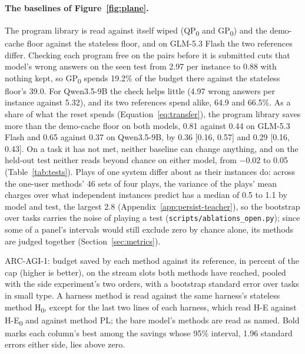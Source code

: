 \paragraph{The baselines of Figure~\ref{fig:plane}.}
\label{app:plane-baselines}
The program library is read against itself wiped (QP\textsubscript{0} and GP\textsubscript{0}) and the demo-cache floor against the stateless floor, and on GLM-5.3 Flash the two references differ. Checking each program free on the pairs before it is submitted cuts that model's wrong answers on the seen test from 2.97 per instance to 0.88 with nothing kept, so GP\textsubscript{0} spends 19.2\% of the budget there against the stateless floor's 39.0. For Qwen3.5-9B the check helps little (4.97 wrong answers per instance against 5.32), and its two references spend alike, 64.9 and 66.5\%. As a share of what the reset spends (Equation~\ref{eq:transfer}), the program library saves more than the demo-cache floor on both models, 0.81 against 0.44 on GLM-5.3 Flash and 0.65 against 0.37 on Qwen3.5-9B, by 0.36 [0.16, 0.57] and 0.29 [0.16, 0.43]. On a task it has not met, neither baseline can change anything, and on the held-out test neither reads beyond chance on either model, from $-0.02$ to 0.05 (Table~\ref{tab:tests}). Plays of one system differ about as their instances do: across the one-user methods' 46 sets of four plays, the variance of the plays' mean charges over what independent instances predict has a median of 0.5 to 1.1 by model and test, the largest 2.8 (Appendix~\ref{app:persist-teacher}), so the bootstrap over tasks carries the noise of playing a test (\texttt{scripts/ablations\_open.py}); since some of a panel's intervals would still exclude zero by chance alone, its methods are judged together (Section~\ref{sec:metrics}).

\begin{table}[htbp]
\centering
\small\setlength{\tabcolsep}{7pt}
\begin{adjustbox}{max width=\linewidth}

\end{adjustbox}
\caption{ARC-AGI-1: budget saved by each method against its reference, in percent of the cap (higher is better), on the stream slots both methods have reached, pooled with the side experiment's two orders, with a bootstrap standard error over tasks in small type. A harness method is read against the same harness's stateless method H\textsubscript{0}, except for the last two lines of each harness, which read \mbox{H-E} against \mbox{H-E\textsubscript{0}} and against method PL; the bare model's methods are read as named. Bold marks each column's best among the savings whose 95\% interval, 1.96 standard errors either side, lies above zero. \ablationnote}
\label{tab:ablation-results}
\end{table}
